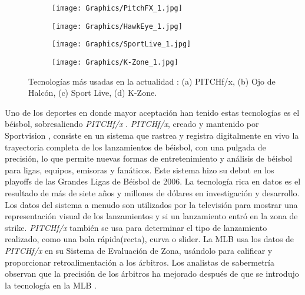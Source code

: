 \begin{figure}[h!]
	\centering
	\begin{subfigure}[b]{0.49\linewidth}
        \centering
		\texttt{[image: Graphics/PitchFX\_1.jpg]}
		\caption{}
	\end{subfigure}
	\begin{subfigure}[b]{0.49\linewidth}
        \centering
		\texttt{[image: Graphics/HawkEye\_1.jpg]}
		\caption{}
	\end{subfigure}
    \begin{subfigure}[b]{0.49\linewidth}
        \centering
        \texttt{[image: Graphics/SportLive\_1.jpg]}
        \caption{}
    \end{subfigure}
    \begin{subfigure}[b]{0.49\linewidth}
        \centering
        \texttt{[image: Graphics/K-Zone\_1.jpg]}
        \caption{}
    \end{subfigure}
    \caption{Tecnologías más usadas en la actualidad : (a) PITCHf/x, (b) Ojo de Halcón,
            (c) Sport Live, (d) K-Zone.}
	\label{fig:technologys}
\end{figure}

Uno de los deportes en donde mayor aceptación han tenido estas tecnologías es el béisbol, sobresaliendo \textit{PITCHf/x} \cite{Pitchf/x}. \textit{PITCHf/x}, creado y mantenido por Sportvision \cite{Sportvision}, consiste en un sistema que rastrea y registra digitalmente en vivo la trayectoria completa de los lanzamientos de béisbol, con una pulgada de precisión, lo que permite nuevas formas de entretenimiento y análisis de béisbol para ligas, equipos, emisoras y fanáticos. Este sistema hizo su debut en los playoffs de las Grandes Ligas de Béisbol \cite[MLB]{MLB} de 2006. La tecnología rica en datos es el resultado de más de siete años y millones de dólares en investigación y desarrollo. Los datos del sistema a menudo son utilizados por la televisión para mostrar una representación visual de los lanzamientos y si un lanzamiento entró en la zona de strike. \textit{PITCHf/x} también se usa para determinar el tipo de lanzamiento realizado, como una bola rápida(recta), curva o slider. La MLB usa los datos de \textit{PITCHf/x} en su Sistema de Evaluación de Zona, usándolo para calificar y proporcionar retroalimentación a los árbitros. Los analistas de sabermetría observan que la precisión de los árbitros ha mejorado después de que se introdujo la tecnología en la MLB \cite{SlateSportArticles}.

